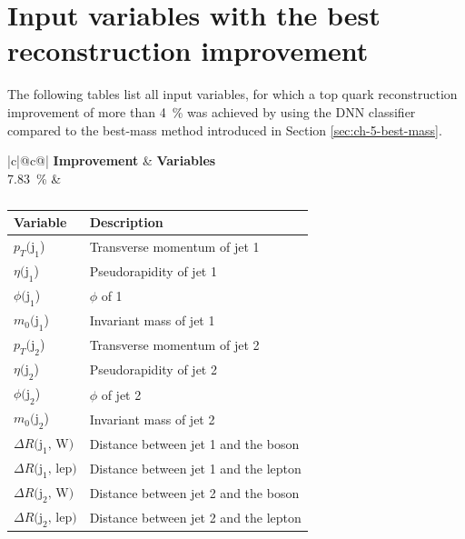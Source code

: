 \chapter{Input variables with the best reconstruction improvement}
The following tables list all input variables, for which a top quark reconstruction improvement of more than \SI{4}{\%} was achieved by using the DNN classifier compared to the best-mass method introduced in Section \ref{sec:ch-5-best-mass}.

\begin{table}[h]
    \centering
    \label{tab:app_vars_1}
    \caption{}
    \begin{tabular}{ |c|@{}c@{}| }
        \hline
        \textbf{Improvement} & \textbf{Variables}\\
        \hline
        \SI{7.83}{\%} & 
        \begin{tabular}{ll}
            \hline
            Variable & Description\\
            \hline
            $p_T\text{(j}_\text{1}$) & Transverse momentum of jet 1\\
            $\eta\text{(j}_\text{1}$) & Pseudorapidity of jet 1\\
            $\phi\text{(j}_\text{1}$) & $\phi$ of 1\\
            $m_0\text{(j}_\text{1}$) & Invariant mass of jet 1\\

            $p_T\text{(j}_\text{2}$) & Transverse momentum of jet 2\\
            $\eta\text{(j}_\text{2}$) & Pseudorapidity of jet 2\\
            $\phi\text{(j}_\text{2}$) & $\phi$ of jet 2\\
            $m_0\text{(j}_\text{2}$) & Invariant mass of jet 2\\

            $\Delta R \text{(j}_\text{1}\text{, W)}$ & Distance between jet 1 and the \PW boson\\
            $\Delta R \text{(j}_\text{1}\text{, lep)}$ & Distance between jet 1 and the lepton\\
            $\Delta R \text{(j}_\text{2}\text{, W)}$ & Distance between jet 2 and the \PW boson\\
            $\Delta R \text{(j}_\text{2}\text{, lep)}$ & Distance between jet 2 and the lepton\\
            \hline
        \end{tabular}\\
        \hline
    \end{tabular}
\end{table}

